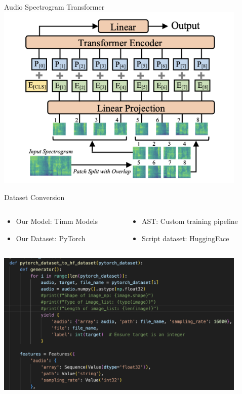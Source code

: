 
\begin{frame}{Audio Spectrogram Transformer}
    \centering
    \includegraphics[height=0.7\textheight,width=0.9\textwidth,keepaspectratio]{images/ast.png}
\end{frame}

\begin{frame}{Dataset Conversion}
    \centering
    \begin{columns}
            \begin{column}{0.5\textwidth}
                \begin{itemize}
                    \item Our Model: Timm Models
                    \item Our Dataset: PyTorch
                \end{itemize}
            \end{column}
            \begin{column}{0.5\textwidth}
                \begin{itemize}
                    \item AST: Custom training pipeline
                    \item Script dataset: HuggingFace
                \end{itemize}
            \end{column}
    \end{columns}
    \includegraphics[height=0.7\textheight,width=0.9\textwidth,keepaspectratio]{images/converter.png}
\end{frame}

